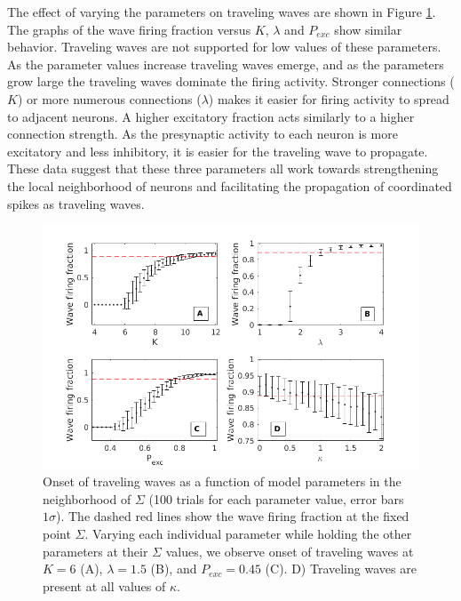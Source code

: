 \documentclass[12pt]{article}
\begin{document}
The effect of varying the parameters on traveling waves are shown in Figure \ref{fig:wave_parameters}.
The graphs of the wave firing fraction versus $K$, $\lambda$ and $P_{exc}$ show similar behavior.
Traveling waves are not supported for low values of these parameters.
As the parameter values increase traveling waves emerge, and as the parameters grow large the traveling waves dominate the firing activity.
Stronger connections ($K$) or more numerous connections ($\lambda$) makes it easier for firing activity to spread to adjacent neurons.
A higher excitatory fraction acts similarly to a higher connection strength. 
As the presynaptic activity to each neuron is more excitatory and less inhibitory, it is easier for the traveling wave to propagate.
These data suggest that these three parameters all work towards strengthening the local neighborhood of neurons and facilitating the propagation of coordinated spikes as traveling waves.

\begin{figure}[!htb]
 \centering
 \includegraphics[width=\textwidth]{fig/ParamWaveSim}
 \caption{Onset of traveling waves as a function of model parameters in the neighborhood of $\Sigma$ (100 trials for each parameter value, error bars $1\sigma$). 
         The dashed red lines show the wave firing fraction at the fixed point $\Sigma$.  
         Varying each individual parameter while holding the other parameters at their $\Sigma$ values, we observe onset of traveling waves at $K=6$ (A), $\lambda=1.5$ (B), and $P_{exc}=0.45$ (C).  
         D) Traveling waves are present at all values of $\kappa$. }
 \label{fig:wave_parameters}
\end{figure}

\FloatBarrier
\end{document}
